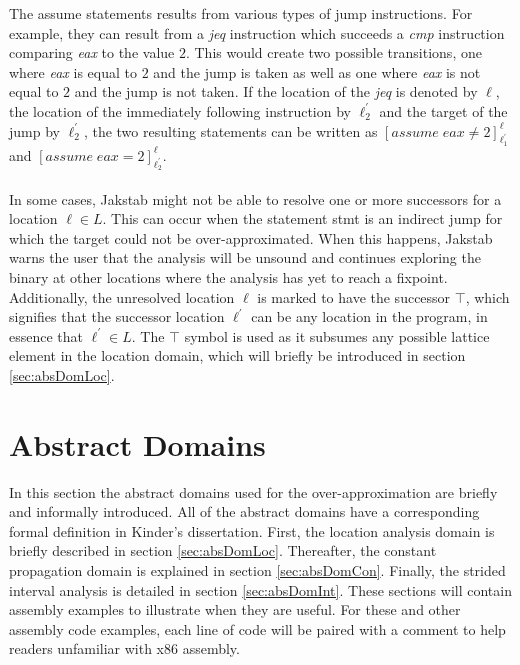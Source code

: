 \documentclass{kththesis}
\newcommand{\fbcomment}[1]{{#1}}
\renewcommand{\fbcomment}[1]{}
\renewcommand{\it}[1]{\textit{#1}}
\begin{document}
The assume statements results from various types of jump instructions. For example, they can result from a \it{jeq} instruction which succeeds a \it{cmp} instruction comparing \it{eax} to the value $2$. This would create two possible transitions, one where \it{eax} is equal to $2$ and the jump is taken as well as one where \it{eax} is not equal to $2$ and the jump is not taken. If the location of the \it{jeq} is denoted by $\ell$, the location of the immediately following instruction by $\ell^{'}_{2}$ and the target of the jump by $\ell^{'}_{2}$, the two resulting statements can be written as $[assume\;eax \neq 2]^{\ell}_{\ell^{'}_{1}}$ and $[assume\;eax = 2]^{\ell}_{\ell^{'}_{2}}$.
\\ \\
In some cases, Jakstab might not be able to resolve one or more successors for a location $\ell \in L$. This can occur when the statement stmt is an indirect jump for which the target could not be over-approximated. When this happens, Jakstab warns the user that the analysis will be unsound and continues exploring the binary at other locations where the analysis has yet to reach a fixpoint. Additionally, the unresolved location $\ell$ is marked to have the successor $\top$, which signifies that the successor location $\ell^{'}$ can be any location in the program, in essence that $\ell^{'} \in L$. The $\top$ symbol is used as it subsumes any possible lattice element in the location domain, which will briefly be introduced in section \ref{sec:absDomLoc}. 




\section{Abstract Domains}\label{sec:absDom}
\fbcomment{\color{red}Goal: Describe the abstract domains of Jakstab and what pros and cons come with each of them.}
In this section the abstract domains used for the over-approximation are briefly and informally introduced. All of the abstract domains have a corresponding formal definition in Kinder's dissertation\cite{Jakstab}. First, the location analysis domain is briefly described in section \ref{sec:absDomLoc}. Thereafter, the constant propagation domain is explained in section \ref{sec:absDomCon}. Finally, the strided interval analysis is detailed in section \ref{sec:absDomInt}. These sections will contain assembly examples to illustrate when they are useful. For these and other assembly code examples, each line of code will be paired with a comment to help readers unfamiliar with x86 assembly.
\end{document}
